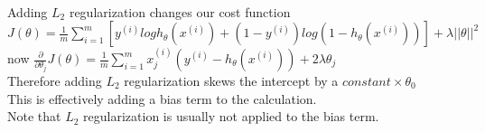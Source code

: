 \begin{answer}\\
Adding $L_2$ regularization changes our cost function\\
$J(\theta)=\frac{1}{m}\sum_{i=1}^{m}[y^{(i)}logh_{\theta}(x^{(i)})+(1-y^{(i)})log(1-h_{\theta}(x^{(i)}))] + \lambda||\theta||^2$\\
now $\frac{\partial}{\partial \theta_j}J(\theta)=\frac{1}{m}\sum_{i=1}^{m}x_j^{(i)}(y^{(i)}-h_{\theta}(x^{(i)}))+2 \lambda \theta_j$\\
Therefore adding $L_2$ regularization skews the intercept by a $constant \times \theta_0$\\
This is effectively adding a bias term to the calculation.\\
Note that $L_2$ regularization is usually not applied to the bias term.
\end{answer}
